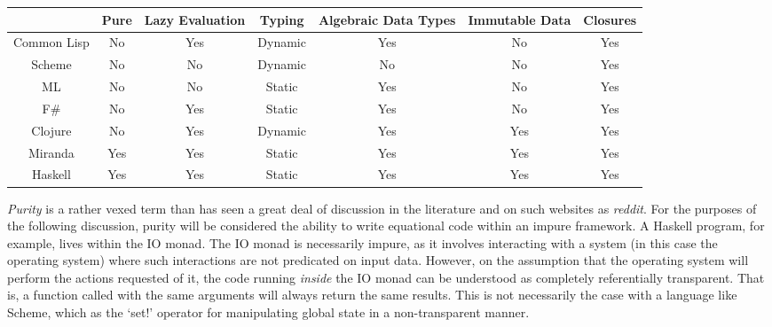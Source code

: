 \documentclass[12pt, a4paper]{report}
\begin{document}
\begin{table}
    \resizebox{\textwidth}{!}
    {\begin{tabular}{|c|cccccc|}
        \hline
                    & Pure                    & Lazy Evaluation     & Typing                      & Algebraic Data Types     & Immutable Data          & Closures \\
        \hline
        Common Lisp & No                      & \cellcolor{LRed}Yes & Dynamic                     & \cellcolor{GoldenRod}Yes & No                      & \cellcolor{LRed}Yes \\
        Scheme      & No                      & No                  & Dynamic                     & No                       & No                      & \cellcolor{LRed}Yes \\
        ML          & No                      & No                  & \cellcolor{Lawngreen}Static & \cellcolor{GoldenRod}Yes & No                      & \cellcolor{LRed}Yes \\
        F\#         & No                      & \cellcolor{LRed}Yes & \cellcolor{Lawngreen}Static & \cellcolor{GoldenRod}Yes & No                      & \cellcolor{LRed}Yes \\
        Clojure     & No                      & \cellcolor{LRed}Yes & Dynamic                     & \cellcolor{GoldenRod}Yes & \cellcolor{Seagreen}Yes & \cellcolor{LRed}Yes \\
        Miranda     & \cellcolor{Seagreen}Yes & \cellcolor{LRed}Yes & \cellcolor{Lawngreen}Static & \cellcolor{GoldenRod}Yes & \cellcolor{Seagreen}Yes & \cellcolor{LRed}Yes \\
        Haskell     & \cellcolor{Seagreen}Yes & \cellcolor{LRed}Yes & \cellcolor{Lawngreen}Static & \cellcolor{GoldenRod}Yes & \cellcolor{Seagreen}Yes & \cellcolor{LRed}Yes \\
        \hline
    \end{tabular}}
\end{table}

\textit{Purity} is a rather vexed term than has seen a great deal of discussion in the literature
and on such websites as \textit{reddit}. For the purposes of the following discussion, purity will
be considered the ability to write equational code within an impure framework. A Haskell program,
for example, lives within the IO monad. The IO monad is necessarily impure, as it involves
interacting with a system (in this case the operating system) where such interactions are not
predicated on input data. However, on the assumption that the operating system will perform the
actions requested of it, the code running \textit{inside} the IO monad can be understood as
completely referentially transparent. That is, a function called with the same arguments will always
return the same results. This is not necessarily the case with a language like Scheme, which as the
`set!' operator for manipulating global state in a non-transparent manner. 
\end{document}
